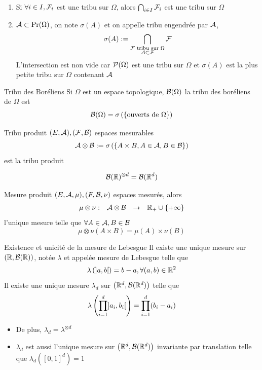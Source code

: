 \documentclass[]{report}
\begin{document}
\begin{prop}{}{}
    \begin{enumerate}[label=\alph*]
        \item Si $\forall i\in I,\mathcal{F}_i$ est une tribu sur $\Omega$, alors $\bigcap_{i\in I}\mathcal{F}_i$ est une tribu sur $\Omega$
        \item $\mathcal{A}\subset \Pr(\Omega)$, on note $\sigma(A)$ et on appelle tribu engendrée par $\mathcal{A}$,
              \[\sigma(A):=\bigcap_{\substack{\mathcal{F} \text{ tribu sur $\Omega$}\\  \mathcal{A}\subset \mathcal{F}}} \mathcal{F}\]
              L'intersection est non vide car $\mathcal{P}(\Omega)$ est une tribu sur $\Omega$ et $\sigma(A)$ est la plus petite tribu sur $\Omega$ contenant $\mathcal{A}$
    \end{enumerate}
\end{prop}

\begin{df}{Tribu des Boréliens}{}
    Si $\Omega$ est un espace topologique, $\mathcal{B}(\Omega)$ la tribu des boréliens de $\Omega$ est
    \[\mathcal{B}(\Omega)=\sigma\left(\left\{\text{ouverts de $\Omega$}\right\}\right)\]
\end{df}

\begin{df}{Tribu produit}{}
    $(E,\mathcal{A}),(\mathcal{F},\mathcal{B})$ espaces mesurables
    \[\mathcal{A}\otimes \mathcal{B} := \sigma \left(\left\{A\times B,A\in \mathcal{A},B\in \mathcal{B}\right\}\right)\]
    est la tribu produit
\end{df}

\begin{prop}{}{}
    \[\mathcal{B}(\mathbb{R})^{\otimes d}=\mathcal{B} (\mathbb{R}^d)\]
\end{prop}

\begin{df}{Mesure produit}{}
    $(E,\mathcal{A},\mu),(F,\mathcal{B},\nu)$ espaces mesurés, alors
    \[\begin{array}{ccccc} \mu \otimes \nu : & \mathcal{A}\otimes \mathcal{B} & \to & \mathbb{R}_+\cup \{+\infty\} \end{array}\]
    l'unique mesure telle que $\forall A\in \mathcal{A},B\in \mathcal{B}$
    \[\mu\otimes \nu(A\times B)= \mu(A)\times \nu (B)\]
\end{df}

\begin{tm}{Existence et unicité de la mesure de Lebesgue}{}
    Il existe une unique mesure sur $(\mathbb{R},\mathcal{B}(\mathbb{R}))$, notée $\lambda$ et appelée mesure de Lebesgue telle que
    \[\lambda\left(]a,b[\right)=b-a,\forall (a,b)\in \mathbb{R}^2\]
    Il existe une unique mesure $\lambda_d$ sur $\left(\mathbb{R}^d,\mathcal{B}(\mathbb{R}^d)\right)$ telle que
    \[\lambda\left(\prod_{i=1}^{d} ]a_i,b_i[\right)=\prod_{i=1}^{d}(b_i-a_i)\]
    \begin{itemize}
        \item De plus, $\lambda_d=\lambda^{\otimes d}$
        \item $\lambda_d$ est aussi l'unique mesure sur $\left(\mathbb{R}^d,\mathcal{B}(\mathbb{R}^d)\right)$ invariante par translation telle que $\lambda_d\left([0,1]^d\right)=1$
    \end{itemize}
\end{tm}
\end{document}

